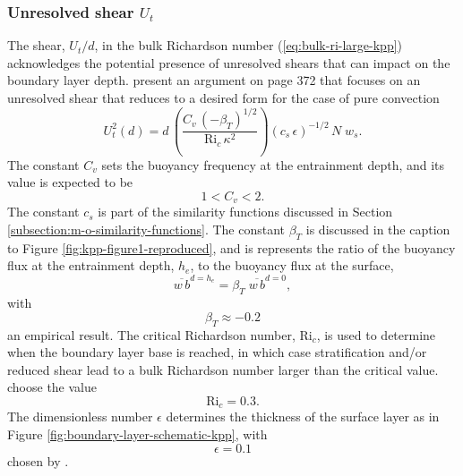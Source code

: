 \subsubsection{Unresolved shear $U_{t}$}
\label{subsubsection:unresolved-shear}

The shear, $U_{t}/d$, in the bulk Richardson number
(\ref{eq:bulk-ri-large-kpp}) acknowledges the potential presence of
unresolved shears that can impact on the boundary layer depth.
\cite{LargeKPP} present an argument on page 372 that focuses on an
unresolved shear that reduces to a desired form for the case of pure
convection
\begin{equation}
 U_{t}^{2}(d) = d \, \left( \frac{C_{v} \,  (-\beta_{T})^{1/2}}{\mbox{Ri}_{c} \, \kappa^{2}} \right)
  (c_{s} \, \epsilon)^{-1/2} \, N \; w_{s}.
\label{eq:unresolved-shear-kpp}
\end{equation}
 The constant $C_{v}$ sets the buoyancy frequency at the entrainment
 depth, and its value is expected to be 
\begin{equation}
 1 < C_{v} < 2. 
\label{eq:Cv-values-given} 
\end{equation}
The constant $c_{s}$ is part of the similarity functions discussed in
Section \ref{subsection:m-o-similarity-functions}.  The constant
$\beta_{T}$ is discussed in the caption to Figure
\ref{fig:kpp-figure1-reproduced}, and is represents the ratio of the
buoyancy flux at the entrainment depth, $h_{e}$, to the buoyancy flux
at the surface,
\begin{equation}
 \overline{w \, b}^{d=h_{e}} = \beta_{T}   \; \overline{w \, b}^{d=0},
\end{equation}
 with 
\begin{equation}
 \beta_{T} \approx -0.2
\end{equation}
an empirical result.  The critical Richardson number, $\mbox{Ri}_{c}$, is
used to determine when the boundary layer base is reached, in which
case stratification and/or reduced shear lead to a bulk Richardson
number larger than the critical value.  \cite{LargeKPP} choose the
value
\begin{equation}
 \mbox{Ri}_{c} = 0.3.  
\label{eq:large-critical-bulk-ri}
\end{equation}
The dimensionless number $\epsilon$ determines the thickness of the
surface layer as in Figure \ref{fig:boundary-layer-schematic-kpp},
with 
\begin{equation}
 \epsilon = 0.1 
\end{equation}
 chosen by \cite{LargeKPP}. 

